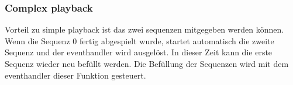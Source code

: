 \subsubsection*{Complex playback}\label{sec:Complex playback}
Vorteil zu simple playback ist das zwei sequenzen mitgegeben werden können. Wenn die Sequenz 0 fertig abgespielt wurde, startet automatisch die zweite Sequenz und der eventhandler wird ausgelöst. In dieser Zeit kann die erste Sequenz wieder neu befüllt werden. Die Befüllung der Sequenzen wird mit dem eventhandler dieser Funktion gesteuert. 
